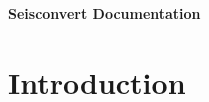 \documentclass[parskip=half, DIV=12]{scrartcl}
\begin{document}
\strut

\vspace{1cm}

\centerline{\huge \textbf{Seisconvert Documentation}}

\vspace{1cm}

\section{Introduction}
\end{document}
